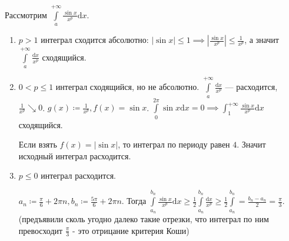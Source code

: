 \begin{example}
    Рассмотрим $\int\limits_a^{+\infty} \frac{\sin x}{x^p} \mathrm{d}x$.
    \begin{enumerate}
    \item $p > 1$ интеграл сходится абсолютно:  $|\sin x| \le 1 \implies \left| \frac{\sin x}{x^p} \right| \le \frac{1}{x^p}$, а значит $\int\limits_a^{+\infty} \frac{\mathrm{d}x}{x^p}$ сходящийся.
    \item $0 < p \le 1$ интеграл сходящийся, но не абсолютно. $\int\limits_a^{+\infty} \frac{\mathrm{d}x}{x^p}$ --- расходится, $\frac{1}{x^p} \searrow 0$. $g(x) \coloneqq \frac{1}{x^p}, f(x) = \sin x$. $\int\limits_0^{2\pi} \sin x \mathrm{d}x = 0 \implies \int_1^{+\infty} \frac{\sin x}{x^p} \mathrm{d}x$ сходящийся.

        Если взять $f(x) = |\sin x|$, то интеграл по периоду равен  $4$. Значит исходный интеграл расходится.
    \item $p \le 0$ интеграл расходится. 

        $a_n \coloneqq \frac{\pi}{6} + 2\pi n, b_n \coloneqq \frac{5\pi}{6} + 2\pi n$. Тогда $\int\limits_{a_n}^{b_n} \frac{\sin x}{x^p} \mathrm{d}x \ge \frac{1}{2} \int\limits_{a_n}^{b_n} \frac{\mathrm{d}x}{x^p} \ge \frac{1}{2} \int\limits_{a_n}^{b_n} = \frac{b_n - a_n}{2} = \frac{\pi}{3}$. \\
        (предъявили сколь угодно далеко такие отрезки, что интеграл по ним превосходит $\frac{\pi}{3}$ - это отрицание критерия Коши)
    \end{enumerate}
\end{example}
